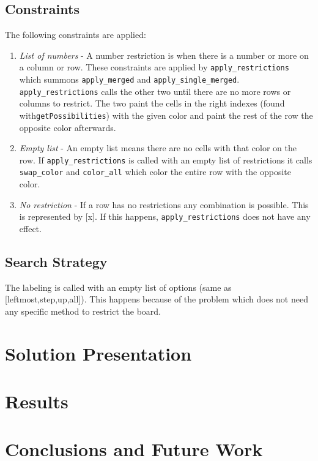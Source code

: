 \documentclass[runningheads,a4paper]{llncs}
\begin{document}
\subsection{Constraints}

	The following constraints are applied:

	\begin{enumerate}
	\item \emph{List of numbers}
		- A number restriction is when there is a number or more on a column or row. These constraints are applied by \verb|apply_restrictions| which summons \verb|apply_merged| and \verb|apply_single_merged|. \verb|apply_restrictions| calls the other two until there are no more rows or columns to restrict. The two paint the cells in the right indexes (found with\verb|getPossibilities|) with the given color and paint the rest of the row the opposite color afterwards. 
	\item \emph{Empty list}
		- An empty list means there are no cells with that color on the row. If \verb|apply_restrictions| is called with an empty list of restrictions it calls \verb|swap_color| and \verb|color_all| which color the entire row with the opposite color.
	\item \emph{No restriction}
		- If a row has no restrictions any combination is possible. This is represented by [x]. If this happens, \verb|apply_restrictions| does not have any effect.
	\end{enumerate}

\subsection{Search Strategy}

	The labeling is called with an empty list of options (same as [leftmost,step,up,all]). This happens because of the problem which does not need any specific method to restrict the board.

\section{Solution Presentation}


\section{Results}


\section{Conclusions and Future Work}
\end{document}
